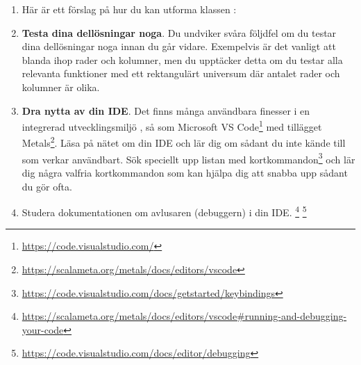 \begin{enumerate}[leftmargin=*]
\item Här är ett förslag på hur du kan utforma klassen :

\item \textbf{Testa dina dellösningar noga}. Du undviker svåra följdfel om du testar dina dellösningar noga innan du går vidare. Exempelvis är det vanligt att blanda ihop rader och kolumner, men du upptäcker detta om du testar alla relevanta funktioner med ett rektangulärt universum där antalet rader och kolumner är olika.

\item \textbf{Dra nytta av din IDE}. Det finns många användbara finesser i en integrerad utvecklingsmiljö , så som Microsoft VS Code\footnote{\url{https://code.visualstudio.com/}} med tillägget Metals\footnote{\url{https://scalameta.org/metals/docs/editors/vscode}}. Läsa på nätet om din IDE och lär dig om sådant du inte kände till som verkar användbart. Sök speciellt upp listan med kortkommandon\footnote{\url{https://code.visualstudio.com/docs/getstarted/keybindings}} och lär dig några valfria kortkommandon som kan hjälpa dig att snabba upp sådant du gör ofta. 
\item Studera dokumentationen om avlusaren (debuggern) i din IDE. \footnote{\url{https://scalameta.org/metals/docs/editors/vscode\#running-and-debugging-your-code}}  \footnote{\url{https://code.visualstudio.com/docs/editor/debugging}} 
\end{enumerate}
